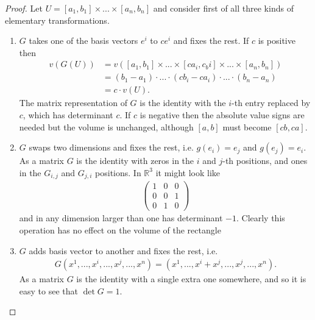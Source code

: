 \documentclass[20pt]{article}
\theoremstyle{plain}
\theoremstyle{definition}
\newcommand{\reals}{\mathbb{R}}
\begin{document}
\begin{proof}
  Let $U = [a_1, b_1] \times ... \times [a_n, b_n]$
  and consider first of all three kinds of elementary transformations.  
  \begin{enumerate}
     \item $G$ takes one of the basis vectors $e^i$ to $ce^i$ and fixes the rest.
     If $c$ is positive then 
     \begin{align*}
       v(G(U))
       &= v([a_1, b_1]\times...\times[ca_i, c_bi]\times...\times[a_n, b_n]) \\
       &= (b_1 - a_1)\cdot...\cdot(cb_i - ca_i)\cdot ... \cdot(b_n-a_n) \\
       &= c\cdot v(U).
     \end{align*}
     The matrix representation of $G$ is the identity with the $i$-th 
     entry replaced by $c$, which has determinant $c.$ 
     If $c$ is negative then the absolute value signs are needed but 
     the volume is unchanged, although $[a, b]$ must become $[cb, ca]$. 

     \item $G$ swaps two dimensions and fixes the rest, i.e. 
     $g(e_i) = e_j$ and $g(e_j) =e_i.$
     As a matrix $G$ is the identity with zeros in the $i$ and $j$-th positions, 
     and ones in the $G_{i, j}$ and $G_{j,i}$ positions.  In $\reals^3$ it might look like
     \begin{align*}       
       \begin{pmatrix}
         1 & 0 & 0 \\
         0 & 0 & 1 \\
         0 & 1 & 0
       \end{pmatrix}
     \end{align*}
     and in any dimension larger than one has determinant $-1.$  
     Clearly this operation has no effect on the volume of the rectangle 

     \item $G$ adds basis vector to another and fixes the rest, i.e.
     \begin{align*}
       G(x^1,..., x^i,..., x^j,..., x^n) = (x^1,..., x^i + x^j,..., x^j,..., x^n).
     \end{align*}
     As a matrix $G$ is the identity with a single extra one somewhere, and so it is easy to 
     see that $\det G = 1$.



\end{enumerate}
\end{proof}
\end{document}
